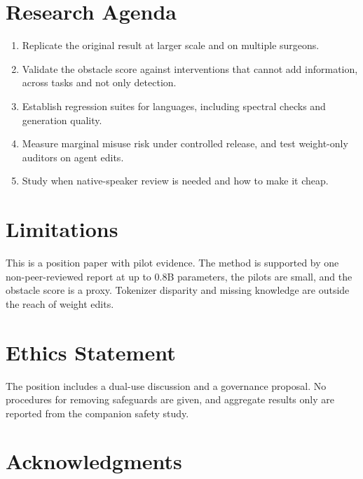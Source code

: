 \documentclass[11pt]{article}
\begin{document}
\section{Research Agenda}
\label{sec:agenda}
\begin{enumerate}\itemsep0pt
\item Replicate the original result at larger scale and on multiple surgeons.
\item Validate the obstacle score against interventions that cannot add information, across tasks and not only detection.
\item Establish regression suites for languages, including spectral checks and generation quality.
\item Measure marginal misuse risk under controlled release, and test weight-only auditors on agent edits.
\item Study when native-speaker review is needed and how to make it cheap.
\end{enumerate}

\section*{Limitations}
This is a position paper with pilot evidence. The method is supported by one non-peer-reviewed report at up to 0.8B parameters, the pilots are small, and the obstacle score is a proxy. Tokenizer disparity and missing knowledge are outside the reach of weight edits.

\section*{Ethics Statement}
The position includes a dual-use discussion and a governance proposal. No procedures for removing safeguards are given, and aggregate results only are reported from the companion safety study.

\section*{Acknowledgments}


\end{document}

